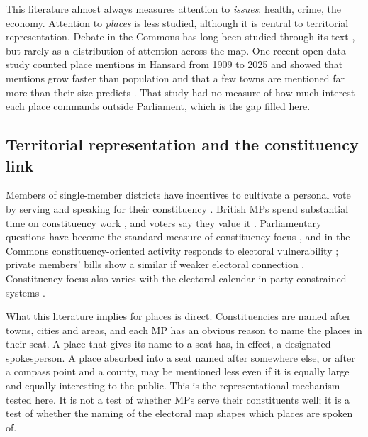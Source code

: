 \documentclass[11pt,a4paper]{article}
\begin{document}
This literature almost always measures attention to \emph{issues}: health, crime, the economy. Attention to \emph{places} is less studied, although it is central to territorial representation. Debate in the Commons has long been studied through its text \citep{EggersSpirling2014,ProkschSlapin2015}, but rarely as a distribution of attention across the map. One recent open data study counted place mentions in Hansard from 1909 to 2025 and showed that mentions grow faster than population and that a few towns are mentioned far more than their size predicts \citep{Hotham2026}. That study had no measure of how much interest each place commands outside Parliament, which is the gap filled here.

\subsection{Territorial representation and the constituency link}
Members of single-member districts have incentives to cultivate a personal vote by serving and speaking for their constituency \citep{CainFerejohnFiorina1987}. British MPs spend substantial time on constituency work \citep{NortonWood1993,Searing1994}, and voters say they value it \citep{VivyanWagner2016}. Parliamentary questions have become the standard measure of constituency focus \citep{Martin2011,Russo2011,Zittel2019}, and in the Commons constituency-oriented activity responds to electoral vulnerability \citep{Kellermann2013,Kellermann2016}; private members' bills show a similar if weaker electoral connection \citep{Bowler2010}. Constituency focus also varies with the electoral calendar in party-constrained systems \citep{Fernandes2018}.

What this literature implies for places is direct. Constituencies are named after towns, cities and areas, and each MP has an obvious reason to name the places in their seat. A place that gives its name to a seat has, in effect, a designated spokesperson. A place absorbed into a seat named after somewhere else, or after a compass point and a county, may be mentioned less even if it is equally large and equally interesting to the public. This is the representational mechanism tested here. It is not a test of whether MPs serve their constituents well; it is a test of whether the naming of the electoral map shapes which places are spoken of.
\end{document}
